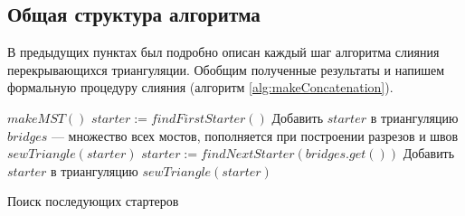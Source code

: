 \documentclass[12pt]{article}
\begin{document}
\subsection{Общая структура алгоритма}
В предыдущих пунктах был подробно описан каждый шаг алгоритма слияния перекрывающихся триангуляции.
Обобщим полученные результаты и напишем формальную процедуру слияния (алгоритм \ref{alg:makeConcatenation}).

\begin{algorithm}[htb!]
\begin{algorithmic}[1]
	\State $makeMST()$
	\State $starter := findFirstStarter()$
	\State Добавить $starter$ в триангуляцию
	\State $bridges$ --- множество всех мостов, пополняется при построении разрезов и швов
	\State $sewTriangle(starter)$
		\State $starter := findNextStarter(bridges.get())$
		\State Добавить $starter$ в триангуляцию
		\State $sewTriangle(starter)$
	\EndWhile
\EndProcedure
\end{algorithmic}
\caption{Поиск последующих стартеров}
\label{alg:makeConcatenation}
\end{algorithm}

\newpage




\end{document}
